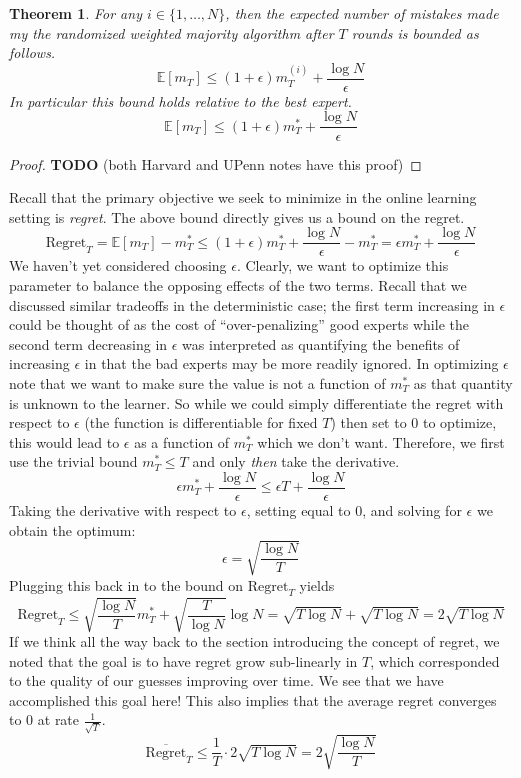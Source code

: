 \documentclass[12pt]{article}
\newcommand{\E}{\mathbb{E}}
\newtheorem{thm}{Theorem}
\begin{document}
\begin{thm}
For any $i \in \{1, \dots, N\}$, then the expected number of mistakes made my the randomized weighted majority algorithm after $T$ rounds is bounded as follows.
\[\E[m_T] \leq (1 + \epsilon)m_T^{(i)} + \frac{\log N}{\epsilon}\]
In particular this bound holds relative to the best expert. 
\[\E[m_T] \leq (1 + \epsilon)m_T^{*} + \frac{\log N}{\epsilon}\]
\end{thm}

\begin{proof}
\textbf{TODO} (both Harvard and UPenn notes have this proof)
\end{proof}

Recall that the primary objective we seek to minimize in the online learning setting is \textit{regret}. The above bound directly gives us a bound on the regret. 
\[\text{Regret}_T = \E[m_T] - m_T^* \leq (1 + \epsilon)m_T^{*} + \frac{\log N}{\epsilon} - m_T^* = \epsilon m_T^* + \frac{\log N}{\epsilon}\]
We haven't yet considered choosing $\epsilon$. Clearly, we want to optimize this parameter to balance the opposing effects of the two terms. Recall that 
we discussed similar tradeoffs in the deterministic case; the first term increasing in $\epsilon$ could be thought of as the cost of ``over-penalizing'' good experts
while the second term decreasing in $\epsilon$ was interpreted as quantifying the benefits of increasing $\epsilon$ in that the bad experts may be more 
readily ignored. In optimizing $\epsilon$ note that we want to make sure the value is not a function of $m_T^*$ as that quantity is unknown to the learner. 
So while we could simply differentiate the regret with respect to $\epsilon$ (the function is differentiable for fixed $T$) then set to $0$ to optimize, this would lead
to $\epsilon$ as a function of $m_T^*$ which we don't want. Therefore, we first use the trivial bound $m_T^* \leq T$ and only \textit{then} take the derivative. 
\[\epsilon m_T^* + \frac{\log N}{\epsilon} \leq \epsilon T + \frac{\log N}{\epsilon}\]
Taking the derivative with respect to $\epsilon$, setting equal to $0$, and solving for $\epsilon$ we obtain the optimum:
\[\epsilon = \sqrt{\frac{\log N}{T}}\]
Plugging this back in to the bound on $\text{Regret}_T$ yields
\[\text{Regret}_T \leq  \sqrt{\frac{\log N}{T}} m_T^* +  \sqrt{\frac{T}{\log N}}\log N = \sqrt{T \log N} + \sqrt{T \log N} = 2\sqrt{T \log N}\]
If we think all the way back to the section introducing the concept of regret, we noted that the goal is to have regret grow sub-linearly in $T$, which corresponded 
to the quality of our guesses improving over time. We see that we have accomplished this goal here! This also implies that the average regret converges to $0$
at rate $\frac{1}{\sqrt{T}}$. 
\[\overline{\text{Regret}}_T \leq \frac{1}{T} \cdot 2\sqrt{T \log N} = 2\sqrt{\frac{\log N}{T}}\]
\end{document}
